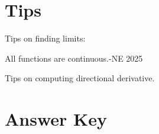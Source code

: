 \documentclass[openany]{book}
\begin{document}
\chapter{Tips}


Tips on finding limits:

All functions are continuous.-NE 2025



Tips on computing directional derivative.



\chapter{Answer Key}



\renewcommand\thesection{\arabic{section}}

\noindent
\end{document}
